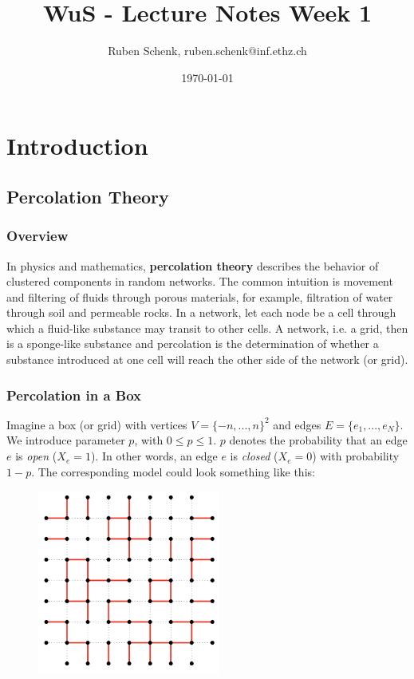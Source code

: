 \documentclass[a4paper]{extarticle}
\title{WuS - Lecture Notes Week 1}
\author{Ruben Schenk, ruben.schenk@inf.ethz.ch}
\date{\today}
\begin{document}
\maketitle

\section{Introduction}

\subsection{Percolation Theory}

\subsubsection{Overview}

In physics and mathematics, \textbf{percolation theory} describes the behavior of clustered components in random networks. The common intuition is movement and filtering of fluids through porous materials, for example, filtration of water through soil and permeable rocks. In a network, let each node be a cell through which a fluid-like substance may transit to other cells. A network, i.e. a grid, then is a sponge-like substance and percolation is the determination of whether a substance introduced at one cell will reach the other side of the network (or grid).

\subsubsection{Percolation in a Box}

Imagine a box (or grid) with vertices \(V = \{-n,...,n\}^2\) and edges \(E = \{e_1,...,e_N\}\). We introduce parameter \(p\), with \(0 \leq p \leq 1\). \(p\) denotes the probability that an edge \(e\) is \textit{open} (\(X_e = 1\)). In other words, an edge \(e\) is \textit{closed} (\(X_e = 0\)) with probability \(1-p\). The corresponding model could look something like this:

\begin{figure}[H]
    \includegraphics[width=6cm]{../images/WuS_Fig1-1}
    \centering
\end{figure}
\end{document}
